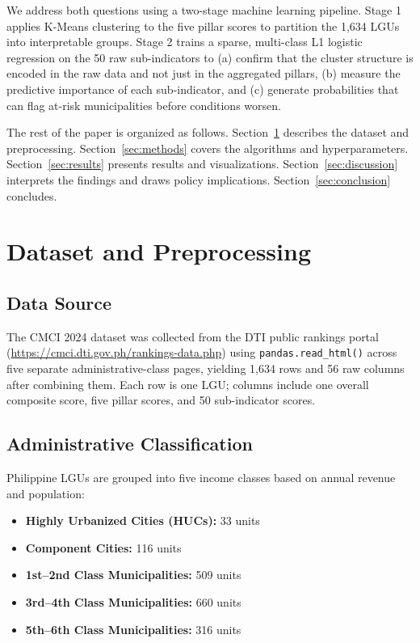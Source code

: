 \documentclass[conference]{IEEEtran}
\begin{document}
We address both questions using a two-stage machine learning pipeline. Stage 1 applies K-Means clustering to the five pillar scores to partition the 1,634 LGUs into interpretable groups. Stage 2 trains a sparse, multi-class L1 logistic regression on the 50 raw sub-indicators to (a) confirm that the cluster structure is encoded in the raw data and not just in the aggregated pillars, (b) measure the predictive importance of each sub-indicator, and (c) generate probabilities that can flag at-risk municipalities before conditions worsen.

The rest of the paper is organized as follows. Section~\ref{sec:data} describes the dataset and preprocessing. Section~\ref{sec:methods} covers the algorithms and hyperparameters. Section~\ref{sec:results} presents results and visualizations. Section~\ref{sec:discussion} interprets the findings and draws policy implications. Section~\ref{sec:conclusion} concludes.

\section{Dataset and Preprocessing}
\label{sec:data}

\subsection{Data Source}

The CMCI 2024 dataset was collected from the DTI public rankings portal (\url{https://cmci.dti.gov.ph/rankings-data.php}) using \texttt{pandas.read\_html()} across five separate administrative-class pages, yielding 1,634 rows and 56 raw columns after combining them. Each row is one LGU; columns include one overall composite score, five pillar scores, and 50 sub-indicator scores.

\subsection{Administrative Classification}

Philippine LGUs are grouped into five income classes based on annual revenue and population:

\begin{itemize}
    \item \textbf{Highly Urbanized Cities (HUCs):} 33 units
    \item \textbf{Component Cities:} 116 units
    \item \textbf{1st--2nd Class Municipalities:} 509 units
    \item \textbf{3rd--4th Class Municipalities:} 660 units
    \item \textbf{5th--6th Class Municipalities:} 316 units
\end{itemize}
\end{document}

